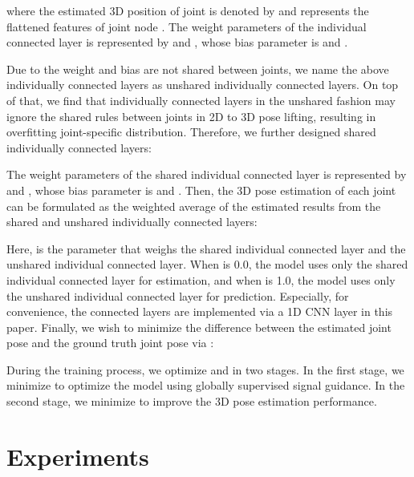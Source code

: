 \documentclass[10pt,twocolumn,letterpaper]{article}
\begin{document}
where the estimated 3D position of joint  is denoted by  and  represents the flattened features of  joint node . The weight parameters of the individual connected layer is represented by  and , whose bias parameter is  and .

Due to the weight  and bias  are not shared between joints, we name the above individually connected layers as unshared individually connected layers. On top of that, we find that individually connected layers in the unshared fashion may ignore the shared rules between joints in 2D to 3D pose lifting, resulting in overfitting joint-specific distribution. Therefore, we further designed shared individually connected layers:

The weight parameters of the shared individual connected layer is represented by  and , whose bias parameter is  and . Then, the 3D pose estimation of each joint can be formulated as the weighted average of the estimated results from the shared and unshared individually connected layers:

Here,  is the parameter that weighs the shared individual connected layer and the unshared individual connected layer. When  is 0.0, the model uses only the shared individual connected layer for estimation, and when  is 1.0, the model uses only the unshared individual connected layer for prediction. Especially, for convenience, the connected layers are implemented via a 1D CNN layer in this paper. Finally, we wish to minimize the difference between the estimated joint pose  and the ground truth joint pose  via :


During the training process, we optimize  and  in two stages. In the first stage, we minimize  to optimize the model using globally supervised signal guidance. In the second stage, we minimize  to improve the 3D pose estimation performance.

\section{Experiments}
\end{document}
